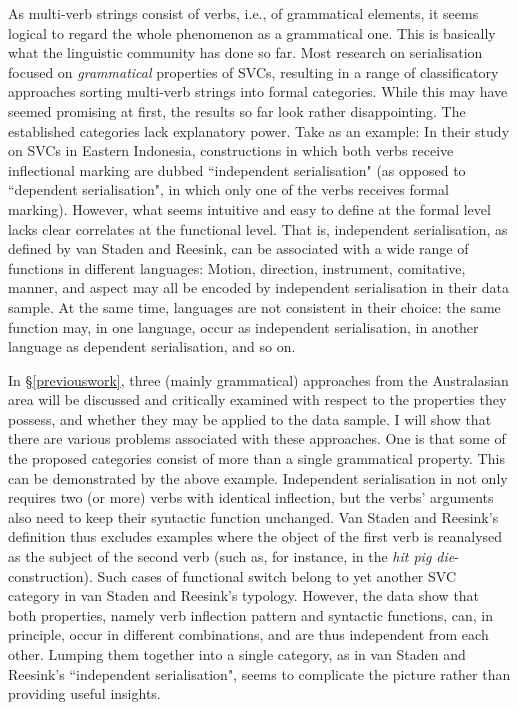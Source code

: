As multi-verb strings consist of verbs, i.e., of grammatical elements, it seems logical to regard the whole phenomenon as a grammatical one. This is basically what the linguistic community has done so far. Most research on serialisation focused on \emph{grammatical} properties of SVCs, resulting in a range of classificatory approaches sorting multi-verb strings into formal categories. While this may have seemed promising at first, the results so far look rather disappointing. The established categories lack explanatory power. Take \citet{vanstaden2008serial} as an example: In their study on SVCs in Eastern Indonesia, constructions in which both verbs receive inflectional marking are dubbed ``independent serialisation" (as opposed to ``dependent serialisation", in which only one of the verbs receives formal marking). However, what seems intuitive and easy to define at the formal level lacks clear correlates at the functional level. That is, independent serialisation, as defined by van Staden and Reesink, can be associated with a wide range of functions in different languages: Motion, direction, instrument, comitative, manner, and aspect may all be encoded by independent serialisation in their data sample. At the same time, languages are not consistent in their choice: the same function may, in one language, occur as independent serialisation, in another language as dependent serialisation, and so on. 

In §\ref{previouswork}, three (mainly grammatical) approaches from the Australasian area will be discussed and critically examined with respect to the properties they possess, and whether they may be applied to the data sample. I will show that there are various problems associated with these approaches. One is that some of the proposed categories consist of more than a single grammatical property. This can be demonstrated by the above example. Independent serialisation in \citet{vanstaden2008serial} not only requires two (or more) verbs with identical inflection, but the verbs' arguments also need to keep their syntactic function unchanged. Van Staden and Reesink's definition thus excludes examples where the object of the first verb is reanalysed as the subject of the second verb (such as, for instance, in the \textit{hit pig die}-construction). Such cases of functional switch belong to yet another SVC category in van Staden and Reesink's typology. However, the data show that both properties, namely verb inflection pattern and syntactic functions, can, in principle, occur in different combinations, and are thus independent from each other. Lumping them together into a single category, as in van Staden and Reesink's ``independent serialisation", seems to complicate the picture rather than providing useful insights. 

